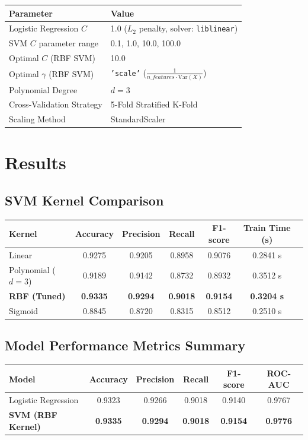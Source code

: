 \documentclass[12pt,a4paper]{article}
\begin{document}
\begin{tabular}{ll}
\toprule
Parameter & Value\\
\midrule
Logistic Regression $C$ & 1.0 ($L_2$ penalty, solver: \texttt{liblinear}) \\
SVM $C$ parameter range & 0.1, 1.0, 10.0, 100.0 \\
Optimal $C$ (RBF SVM) & 10.0 \\
Optimal $\gamma$ (RBF SVM) & \texttt{'scale'} ($\frac{1}{n\_features \cdot \text{Var}(X)}$) \\
Polynomial Degree & $d = 3$ \\
Cross-Validation Strategy & 5-Fold Stratified K-Fold \\
Scaling Method & StandardScaler \\
\bottomrule
\end{tabular}

\section{Results}

\subsection*{SVM Kernel Comparison}
\begin{tabular}{lcccccc}
\toprule
Kernel & Accuracy & Precision & Recall & F1-score & Train Time (s) \\
\midrule
Linear & 0.9275 & 0.9205 & 0.8958 & 0.9076 & 0.2841 s \\
Polynomial ($d=3$) & 0.9189 & 0.9142 & 0.8732 & 0.8932 & 0.3512 s \\
\textbf{RBF (Tuned)} & \textbf{0.9335} & \textbf{0.9294} & \textbf{0.9018} & \textbf{0.9154} & \textbf{0.3204 s} \\
Sigmoid & 0.8845 & 0.8720 & 0.8315 & 0.8512 & 0.2510 s \\
\bottomrule
\end{tabular}

\subsection*{Model Performance Metrics Summary}
\begin{tabular}{lccccc}
\toprule
Model & Accuracy & Precision & Recall & F1-score & ROC-AUC \\
\midrule
Logistic Regression & 0.9323 & 0.9266 & 0.9018 & 0.9140 & 0.9767 \\
\textbf{SVM (RBF Kernel)} & \textbf{0.9335} & \textbf{0.9294} & \textbf{0.9018} & \textbf{0.9154} & \textbf{0.9776} \\
\bottomrule
\end{tabular}
\end{document}
